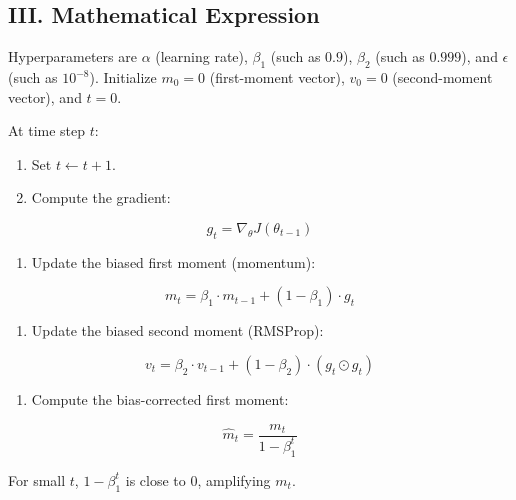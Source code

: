 \hypertarget{iii.-mathematical-expression-2}{%
\subsection{III. Mathematical Expression}\label{iii.-mathematical-expression-2}}

Hyperparameters are \(\alpha\) (learning rate), \(\beta_1\) (such as \(0.9\)), \(\beta_2\) (such as \(0.999\)), and \(\epsilon\) (such as \(10^{-8}\)). Initialize \(m_0=0\) (first-moment vector), \(v_0=0\) (second-moment vector), and \(t=0\).

At time step \(t\):

\begin{enumerate}
\def\labelenumi{\arabic{enumi}.}
\tightlist
\item
  Set \(t \leftarrow t+1\).
\item
{}
  Compute the gradient:
\end{enumerate}

\[
g_t = \nabla_\theta J(\theta_{t-1})
\]

\begin{enumerate}
\def\labelenumi{\arabic{enumi}.}
\setcounter{enumi}{2}
\tightlist
\item
{}
  Update the biased first moment (momentum):
\end{enumerate}

\[
m_t = \beta_1 \cdot m_{t-1} + (1-\beta_1)\cdot g_t
\]

\begin{enumerate}
\def\labelenumi{\arabic{enumi}.}
\setcounter{enumi}{3}
\tightlist
\item
{}
  Update the biased second moment (RMSProp):
\end{enumerate}

\[
v_t = \beta_2 \cdot v_{t-1} + (1-\beta_2)\cdot (g_t \odot g_t)
\]

\begin{enumerate}
\def\labelenumi{\arabic{enumi}.}
\setcounter{enumi}{4}
\tightlist
\item
{}
  Compute the bias-corrected first moment:
\end{enumerate}

\[
\hat{m}_t = \frac{m_t}{1-\beta_1^t}
\]

For small \(t\), \(1-\beta_1^t\) is close to \(0\), amplifying \(m_t\).

